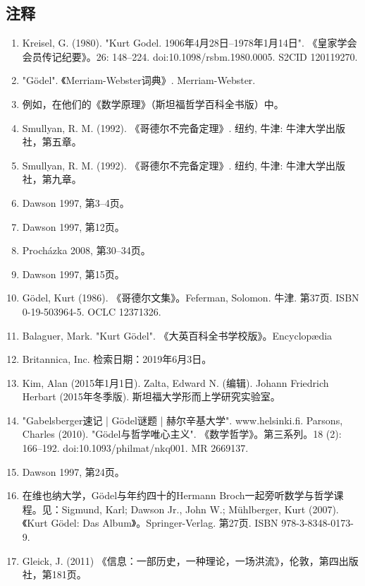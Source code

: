 \subsection{注释}  
\begin{enumerate}
\item Kreisel, G. (1980). "Kurt Godel. 1906年4月28日–1978年1月14日". 《皇家学会会员传记纪要》。26: 148–224. doi:10.1098/rsbm.1980.0005. S2CID 120119270.  
\item "Gödel". 《Merriam-Webster词典》. Merriam-Webster.  
\item 例如，在他们的《数学原理》（斯坦福哲学百科全书版）中。  
\item Smullyan, R. M. (1992). 《哥德尔不完备定理》. 纽约, 牛津: 牛津大学出版社，第五章。  
\item Smullyan, R. M. (1992). 《哥德尔不完备定理》. 纽约, 牛津: 牛津大学出版社，第九章。  
\item Dawson 1997, 第3–4页。  
\item Dawson 1997, 第12页。  
\item Procházka 2008, 第30–34页。  
\item Dawson 1997, 第15页。  
\item Gödel, Kurt (1986). 《哥德尔文集》。Feferman, Solomon. 牛津. 第37页. ISBN 0-19-503964-5. OCLC 12371326.  
\item Balaguer, Mark. "Kurt Gödel". 《大英百科全书学校版》。Encyclopædia \item Britannica, Inc. 检索日期：2019年6月3日。  
\item Kim, Alan (2015年1月1日). Zalta, Edward N. (编辑). Johann Friedrich Herbart (2015年冬季版). 斯坦福大学形而上学研究实验室。  
\item "Gabelsberger速记 | Gödel谜题 | 赫尔辛基大学". www.helsinki.fi.  
Parsons, Charles (2010). "Gödel与哲学唯心主义". 《数学哲学》。第三系列。18 (2): 166–192. doi:10.1093/philmat/nkq001. MR 2669137.  
\item Dawson 1997, 第24页。  
\item 在维也纳大学，Gödel与年约四十的Hermann Broch一起旁听数学与哲学课程。见：Sigmund, Karl; Dawson Jr., John W.; Mühlberger, Kurt (2007). 《Kurt Gödel: Das Album》。Springer-Verlag. 第27页. ISBN 978-3-8348-0173-9.  
\item Gleick, J. (2011) 《信息：一部历史，一种理论，一场洪流》，伦敦，第四出版社，第181页。
\end{enumerate}